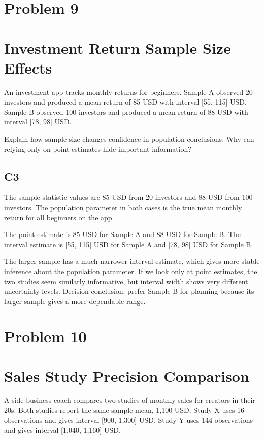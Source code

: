 \begin{ExamProblems}
		\newpage
		\item
		\section{Problem 9}
		\section{Investment Return Sample Size Effects}
		An investment app tracks monthly returns for beginners.
		Sample A observed 20 investors and produced a mean return of 85 USD with interval [55, 115] USD.
		Sample B observed 100 investors and produced a mean return of 88 USD with interval [78, 98] USD.

		Explain how sample size changes confidence in population conclusions.
		Why can relying only on point estimates hide important information?

		\subsection*{C3}
		The sample statistic values are 85 USD from 20 investors and 88 USD from 100 investors.
		The population parameter in both cases is the true mean monthly return for all beginners on the app.

		The point estimate is 85 USD for Sample A and 88 USD for Sample B.
		The interval estimate is [55, 115] USD for Sample A and [78, 98] USD for Sample B.

		The larger sample has a much narrower interval estimate, which gives more stable inference about the population parameter.
		If we look only at point estimates, the two studies seem similarly informative, but interval width shows very different uncertainty levels.
		Decision conclusion: prefer Sample B for planning because its larger sample gives a more dependable range.

		\newpage
		\item
		\section{Problem 10}
		\section{Sales Study Precision Comparison}
		A side-business coach compares two studies of monthly sales for creators in their 20s.
		Both studies report the same sample mean, 1,100 USD.
		Study X uses 16 observations and gives interval [900, 1,300] USD.
		Study Y uses 144 observations and gives interval [1,040, 1,160] USD.


\end{ExamProblems}
